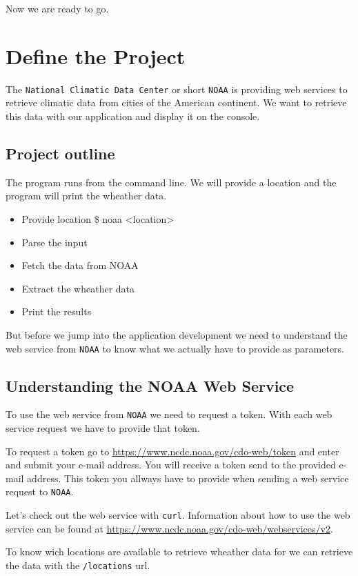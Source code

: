 \documentclass[10pt, a4paper]{article}
\begin{document}
Now we are ready to go.

\section{Define the Project}
The \texttt{National Climatic Data Center} or short \texttt{NOAA} is providing
web services to retrieve climatic data from cities of the American continent.
We want to retrieve this data with our application and display it on the
console.

\subsection{Project outline}
The program runs from the command line. We will provide a location and the
program will print the wheather data.

\begin{itemize}
  \item Provide location \$ noaa <location>
  \item Parse the input
  \item Fetch the data from NOAA
  \item Extract the wheather data
  \item Print the results
\end{itemize}

But before we jump into the application development we need to understand the
web service from \texttt{NOAA} to know what we actually have to provide as
parameters.

\subsection{Understanding the NOAA Web Service}
To use the web service from \texttt{NOAA} we need to request a token. With each
web service request we have to provide that token.

To request a token go to \url{https://www.ncdc.noaa.gov/cdo-web/token} and 
enter and submit your e-mail address. You will receive a token send to the 
provided e-mail address. This token you allways have to provide when sending
a web service request to \texttt{NOAA}.

Let's check out the web service with \texttt{curl}. Information about how to use
the web service can be found at 
\url{https://www.ncdc.noaa.gov/cdo-web/webservices/v2}.

To know wich locations are available to retrieve wheather data for we can
retrieve the data with the \texttt{/locations} url.
\end{document}
